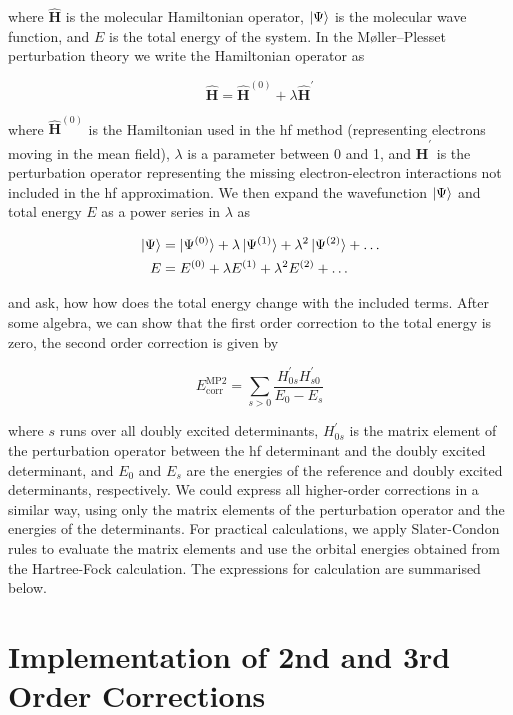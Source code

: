 where \(\hat{\mathbf{H}}\) is the molecular Hamiltonian operator, \(\ket{\Psi}\) is the molecular wave function, and \(E\) is the total energy of the system. In the Møller--Plesset perturbation theory we write the Hamiltonian operator as

\begin{equation}
\hat{\mathbf{H}}=\hat{\mathbf{H}}^{(0)}+\lambda\hat{\mathbf{H}}^{'}
\end{equation}

where \(\hat{\mathbf{H}}^{(0)}\) is the Hamiltonian used in the \acrshort{hf} method (representing electrons moving in the mean field), \(\lambda\) is a parameter between 0 and 1, and \(\hat{\mathbf{H}}^{'}\) is the perturbation operator representing the missing electron-electron interactions not included in the \acrshort{hf} approximation. We then expand the wavefunction \(\ket{\Psi}\) and total energy \(E\) as a power series in \(\lambda\) as

\begin{align}
\ket{\Psi}&=\ket{\Psi^{(0)}}+\lambda\ket{\Psi^{(1)}}+\lambda^2\ket{\Psi^{(2)}}+\dots \\
E&=E^{(0)}+\lambda E^{(1)}+\lambda^2 E^{(2)}+\dots
\end{align}

and ask, how how does the total energy change with the included terms. After some algebra, we can show that the first order correction to the total energy is zero, the second order correction is given by

\begin{equation}
E_{\mathrm{corr}}^{\mathrm{MP2}}=\sum_{s>0}\frac{H_{0s}^{'}H_{s0}^{'}}{E_0-E_s}
\end{equation}

where \(s\) runs over all doubly excited determinants, \(H_{0s}^{'}\) is the matrix element of the perturbation operator between the \acrshort{hf} determinant and the doubly excited determinant, and \(E_0\) and \(E_s\) are the energies of the reference and doubly excited determinants, respectively.\cite{10.1002/wcms.58,1014569052} We could express all higher-order corrections in a similar way, using only the matrix elements of the perturbation operator and the energies of the determinants. For practical calculations, we apply Slater-Condon rules to evaluate the matrix elements and use the orbital energies obtained from the Hartree-Fock calculation. The expressions for calculation are summarised below.

\section{Implementation of 2nd and 3rd Order Corrections}

